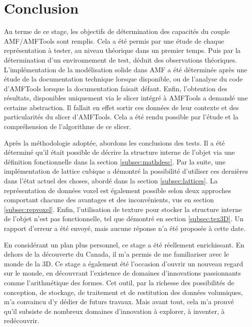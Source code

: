 \documentclass{tnreport}
\begin{document}
\chapter{Conclusion}

Au terme de ce stage, les objectifs de détermination des capacités du couple AMF/AMFTools sont remplis. Cela a été permis par une étude de chaque représentation à tester, au niveau théorique dans un premier temps. Puis par la détermination d'un environnement de test, déduit des observations théoriques. L'implémentation de la modélisation solide dans AMF a été déterminée après une étude de la documentation technique lorsque disponible, ou de l'analyse du code d'AMFTools lorsque la documentation faisait défaut. Enfin, l'obtention des résultats, disponibles uniquement via le slicer intégré à AMFTools a demandé une certaine abstraction. Il fallait en effet sortir ces données de leur contexte et des particularités du slicer d'AMFTools. Cela a été rendu possible par l'étude et la compréhension de l'algorithme de ce slicer. 

Après la méthodologie adoptée, abordons les conclusions des tests. Il a été déterminé qu'il était possible de décrire la structure interne de l'objet via une définition fonctionnelle dans la section \ref{subsec:mathdesc}. Par la suite, une implémentation de lattice cubique a démontré la possibilité d'utiliser ces dernières dans l'état actuel des choses, abordé dans la section \ref{subsec:lattices}. La représentation de données voxel est également possible selon deux approches comportant chacune des avantages et des inconvénients, vus en section \ref{subsec:repvoxel}. Enfin, l'utilisation de texture pour stocker la structure interne de l'objet n'est pas fonctionnelle, tel que démontré en section \ref{subsec:tex3D}. Un rapport d'erreur a été envoyé, mais aucune réponse n'a été proposée à cette date.

En considérant un plan plus personnel, ce stage a été réellement enrichissant. En dehors de la découverte du Canada, il m'a permis de me familiariser avec le monde de la 3D. Ce stage a également été l'occasion d'ouvrir un nouveau regard sur le monde, en découvrant l'existence de domaines d'innovations passionnants comme l'arithmétique des formes. Cet outil, par la richesse des possibilités de conception, de stockage, de traitement et de restitution des données volumiques, m'a convaincu d'y dédier de futurs travaux. Mais avant tout, cela m'a prouvé qu'il subsiste de nombreux domaines d'innovation à explorer, à inventer, à redécouvrir. 
\cleardoublepage
\renewcommand{\tocbibname}{Bibliographie / Webographie}


\end{document}
